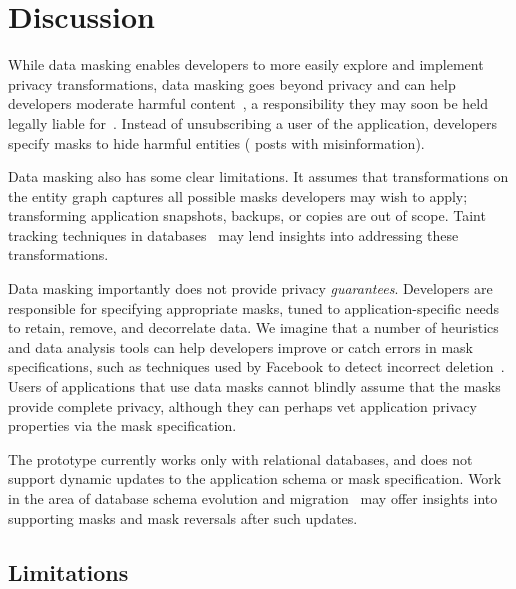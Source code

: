 \section{Discussion}
While data masking enables developers to more easily explore and implement privacy transformations, data masking 
goes beyond privacy and can help developers moderate harmful content~\cite{contentmod,
sasb}, a responsibility they may soon be held legally liable for~\cite{nytimes:230}. Instead of
unsubscribing a user of the application, developers specify masks to hide harmful entities (\eg
posts with misinformation).

Data masking also has some clear limitations. It assumes that transformations on the entity graph
captures all possible masks developers may wish to apply; transforming application
snapshots, backups, or copies are out of scope. Taint tracking techniques in
databases~\cite{schengendb} may lend insights into addressing these transformations.

Data masking importantly does not provide privacy \emph{guarantees}. Developers are responsible for
specifying appropriate masks, tuned to application-specific needs to retain, remove, and decorrelate
data. 
We imagine that a number of heuristics and data analysis tools can help developers improve or catch
errors in mask specifications, such as techniques used by Facebook to detect incorrect
deletion~\cite{delf}.  Users of applications that use data masks cannot blindly assume that the
masks provide complete privacy, although they can perhaps vet application privacy properties via the
mask specification.

The \sys prototype currently works only with relational databases, and does not support dynamic
updates to the application schema or mask specification.
Work in the area of database schema evolution and migration~\cite{schema:evo} may offer insights
into supporting masks and mask reversals after such updates.

\iffalse
\subsection{Limitations}

